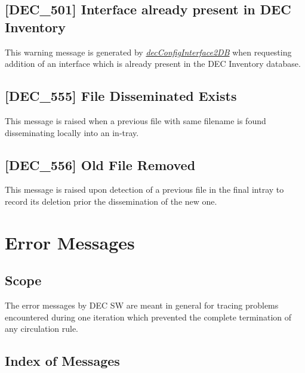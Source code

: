 \documentclass[dec_sum_main.tex]{subfiles}
\begin{document}
\label{DEC501}
\subsection{[DEC\_501] Interface already present in DEC Inventory}
This warning message is generated by \hyperref[decConfigInterface2DB]{\textit{decConfigInterface2DB}} when requesting addition of an interface which is already present in the DEC Inventory database.

\label{DEC555}
\subsection{[DEC\_555] File Disseminated Exists}
This message is raised when a previous file with same filename is found disseminating locally into an in-tray.

\label{DEC556}
\subsection{[DEC\_556] Old File Removed}
This message is raised upon detection of a previous file in the final intray to record its deletion prior the dissemination of the new one.


\newpage
\section{Error Messages}

\subsection{Scope}
The error messages by DEC SW are meant in general for tracing problems encountered during one iteration which prevented the complete termination of any circulation rule.

\subsection{Index of Messages}
\end{document}
